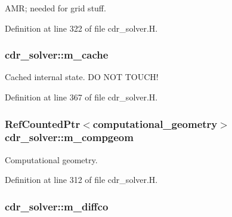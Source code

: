 A\+MR; needed for grid stuff. 



Definition at line 322 of file cdr\+\_\+solver.\+H.

\subsubsection[{\texorpdfstring{m\+\_\+cache}{m_cache}}]{ cdr\+\_\+solver\+::m\+\_\+cache\hspace{0.3cm}{\ttfamily [protected]}}\hypertarget{classcdr__solver_ad9df1d6826a9dbb4d63965b2876d71d8}{}\label{classcdr__solver_ad9df1d6826a9dbb4d63965b2876d71d8}


Cached internal state. DO N\+OT T\+O\+U\+C\+H! 



Definition at line 367 of file cdr\+\_\+solver.\+H.

\subsubsection[{\texorpdfstring{m\+\_\+compgeom}{m_compgeom}}]{\setlength{\rightskip}{0pt plus 5cm}Ref\+Counted\+Ptr$<${\bf computational\+\_\+geometry}$>$ cdr\+\_\+solver\+::m\+\_\+compgeom\hspace{0.3cm}{\ttfamily [protected]}}\hypertarget{classcdr__solver_a61334675e5db1870fa94f7e2e0882af9}{}\label{classcdr__solver_a61334675e5db1870fa94f7e2e0882af9}


Computational geometry. 



Definition at line 312 of file cdr\+\_\+solver.\+H.

\subsubsection[{\texorpdfstring{m\+\_\+diffco}{m_diffco}}]{ cdr\+\_\+solver\+::m\+\_\+diffco\hspace{0.3cm}{\ttfamily [protected]}}\hypertarget{classcdr__solver_a368d0ede88c513dc1a96800f44ec4e42}{}\label{classcdr__solver_a368d0ede88c513dc1a96800f44ec4e42}


